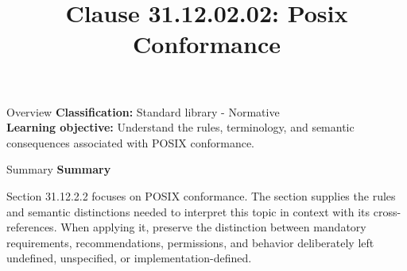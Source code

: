\documentclass[10pt,letterpaper]{article}
\title{Clause 31.12.02.02: Posix Conformance}
\author{}
\date{}
\begin{document}
\maketitle
\begin{CornellOverviewBox}{Overview}
\textbf{Classification:} Standard library - Normative\\[2pt]
\textbf{Learning objective:} Understand the rules, terminology, and semantic consequences associated with POSIX conformance.
\end{CornellOverviewBox}\begin{CornellSummaryBox}{Summary}
{\sffamily\bfseries\color{Accent} Summary}\par\vspace{3pt}Section 31.12.2.2 focuses on POSIX conformance. The section supplies the rules and semantic distinctions needed to interpret this topic in context with its cross-references. When applying it, preserve the distinction between mandatory requirements, recommendations, permissions, and behavior deliberately left undefined, unspecified, or implementation-defined.
\end{CornellSummaryBox}
\end{document}
